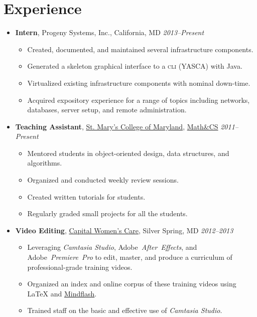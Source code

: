 \documentclass[11pt,a4paper]{article}
\makeatletter
\newcommand{\position}[5]{\item%
  \begin{tabular*}{1.0\linewidth}{l@{\extracolsep{\fill}}r}
    #1 & #2\\
    \textit{#3} & \textit{#4---#5}
  \end{tabular*}}
\renewcommand{\position}[6][]{%
\item[#1] \hspace*{-2em}\textbf{#4}, #2, #3\hfill
  \textit{#5--#6}\vspace*{-.8em}}
\newcommand{\cwc}{\href{http://www.cwcare.net}{Capital Women's Care}}
\newcommand{\software}[1]{\textsl{#1}}
\newcommand{\smcm}{\href{http://www.smcm.edu}
                        {St. Mary's College of Maryland}}
\makeatother
\begin{document}
\section*{Experience}
\begin{itemize}
\position {Progeny Systems, Inc.}
          {California, MD}
          {Intern}
          {2013}{Present}
          \begin{itemize}
          \item Created, documented, and maintained several infrastructure components.
          \item Generated a skeleton graphical interface to a \textsc{cli} (YASCA) with Java.
          \item Virtualized existing infrastructure components with nominal down-time.
          \item Acquired expository experience for a range of topics including
            networks,
            databases,
            server setup, and
            remote administration.
          \end{itemize}

\position {\smcm}
          {\href{http://www.smcm.edu/mathcs}{Math\&CS}}
          {Teaching Assistant}
          {2011}{Present}
          \begin{itemize}
          \item Mentored students in object-oriented design, data structures, and algorithms.
          \item Organized and conducted weekly review sessions.
          \item Created written tutorials for students.
          \item Regularly graded small projects for all the students.
          \end{itemize}

\position {\cwc}
          {Silver Spring, MD}
          {Video Editing}
          {2012}{2013}
          \begin{itemize}
          \item Leveraging \software{Camtasia Studio},
            Adobe~\software{After~Effects}, and
            Adobe~\software{Premiere~Pro} to edit, master, and produce
            a curriculum of professional-grade training videos.
          \item Organized an index and online corpus of these training videos using \LaTeX{} and \href{http://www.mindflash.com/}{Mindflash}.
          \item Trained staff on the basic and effective use of \software{Camtasia Studio}.
          \end{itemize}


\end{itemize}
\end{document}
